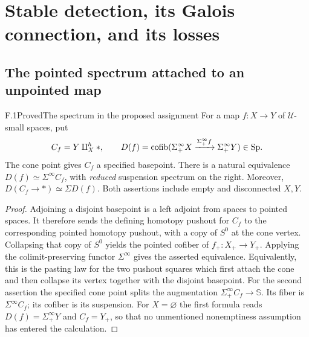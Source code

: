 \section{Stable detection, its Galois connection, and its losses}

\subsection{The pointed spectrum attached to an unpointed map}

\begin{claim}{F.1}{Proved}{The spectrum in the proposed assignment}
For a map $f:X\to Y$ of $\mathcal U$-small spaces, put
\[
 C_f=Y\amalg_X^h *,\qquad
 D(f)=\operatorname{cofib}(\Sigma^\infty_+X\xrightarrow{\Sigma^\infty_+f}
                   \Sigma^\infty_+Y)\in\mathrm{Sp}.
\]
The cone point gives $C_f$ a specified basepoint. There is a natural equivalence
$D(f)\simeq\Sigma^\infty C_f$, with \emph{reduced} suspension spectrum on the
right. Moreover, $D(C_f\to *)\simeq\Sigma D(f)$. Both assertions include
empty and disconnected $X,Y$.
\end{claim}
\begin{proof}
Adjoining a disjoint basepoint is a left adjoint from spaces to pointed spaces.
It therefore sends the defining homotopy pushout for $C_f$ to the corresponding
pointed homotopy pushout, with a copy of $S^0$ at the cone vertex. Collapsing
that copy of $S^0$ yields the pointed cofiber of $f_+:X_+\to Y_+$.
Applying the colimit-preserving functor $\Sigma^\infty$ gives the asserted
equivalence. Equivalently, this is the pasting law for the two pushout squares
which first attach the cone and then collapse its vertex together with the
disjoint basepoint. For the second assertion the specified cone point splits
the augmentation $\Sigma^\infty_+C_f\to\mathbb S$. Its fiber is
$\Sigma^\infty C_f$; its cofiber is its suspension. For $X=\varnothing$ the
first formula reads $D(f)=\Sigma^\infty_+Y$ and $C_f=Y_+$, so that no
unmentioned nonemptiness assumption has entered the calculation.
\end{proof}

